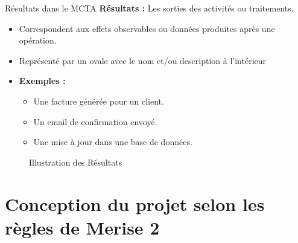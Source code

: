 \documentclass{beamer}
\begin{document}
\begin{frame}{Résultats dans le MCTA}
    \textbf{Résultats :} Les sorties des activités ou traitements.
    \begin{itemize}
        \item Correspondent aux effets observables ou données produites après une opération.
        \item Représenté par un ovale avec le nom et/ou description à l'intérieur
        \item \textbf{Exemples :}
        \begin{itemize}
            \item Une facture générée pour un client.
            \item Un email de confirmation envoyé.
            \item Une mise à jour dans une base de données.
        \end{itemize}
    \end{itemize}
    \vspace{1em}
    \begin{figure}
        \centering
        \label{fig7}
        \caption{Illustration des Résultats}
    \end{figure}
\end{frame}

\section{Conception du projet selon les règles de Merise 2}
\end{document}

